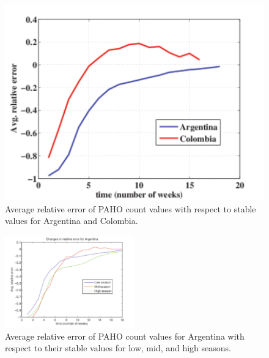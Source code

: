 \begin{figure}[h]
\centering
\includegraphics[width=.85\columnwidth]{fig/ArgentinaColombia.pdf}
\caption{Average relative error of PAHO count values with respect to stable values for
  Argentina and Colombia.
\label{fig:relerrors}
}
\end{figure}

\begin{figure}[h]
  \centering
    \includegraphics[width=0.5\textwidth]{fig/forpaper_seasonalAVGrelativeALLs_Argentina}
  \caption{Average relative error of PAHO count values for Argentina with respect
  to their stable values for low, mid, and high seasons.}
  \label{fig:seasonal_relerrors}
\end{figure}  

